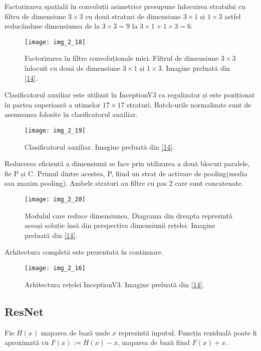 Factorizarea spațială în convoluții asimetrice presupune înlocuirea stratului cu filtru de dimensiune $3 \times 3$ cu două straturi de dimensiune $3 \times 1$ și $1 \times 3$ astfel reducânduse dimensiunea de la $3 \times 3 = 9$ la $3 \times 1 + 1 \times 3 = 6$. 
\begin{figure}[!h]
	\centering
	\texttt{[image: img\_2\_18]}
	\caption[Factorizarea spațială în convoluții asimetrice]{Factorizarea în filtre convoluționale mici. Filtrul de dimensiune $3 \times 3$ înlocuit cu două de dimensiune $3 \times 1$ și $1 \times 3$.  Imagine preluată din \hyperlink{guideinceptionv3}{[14]}.}
\end{figure}

Clasificatorul auxiliar este utilizat în InceptionV3 ca regulizator și este poziționat în partea superioară a utimelor $17 \times 17$ straturi. Batch-urile normalizate sunt de asemeanea folosite în clasificatorul auxiliar.

\begin{figure}[!h]
	\centering
	\texttt{[image: img\_2\_19]}
	\caption[Clasificator auxiliar]{Clasificatorul auxiliar. Imagine preluată din \hyperlink{guideinceptionv3}{[14]}.}
\end{figure}

Reducerea eficientă a dimensiunii se face prin utilizarea a două blocuri paralele, fie P și C. Primul dintre acestea, P, fiind un strat de activare de pooling(media sau maxim pooling). Ambele straturi au filtre cu pas 2 care sunt concatenate.
\begin{figure}[!h]
	\centering
	\texttt{[image: img\_2\_20]}
	\caption[Reducerea eficientă a dimensiunii]{Modulul care reduce dimensiunea. Diagrama din dreapta reprezintă aceași soluție însă din perspectiva dimensiunii rețelei. Imagine preluată din \hyperlink{guideinceptionv3}{[14]}.}
\end{figure}   



Arhitectura completă este prezentată în continuare.
\begin{figure}[!h]
	\centering
	\texttt{[image: img\_2\_16]}
	\caption[Arhitectura InceptionV3]{Arhitectura rețelei InceptionV3. Imagine preluată din \hyperlink{guideinceptionv3}{[14]}.}
\end{figure}   


\subsection{ResNet}
Fie $H(x)$ maparea de bază unde $x$ reprezintă inputul. Funcția reziduală poate fi aproximată cu $F(x) := H(x) - x$, maparea de bază fiind $F(x) + x$.

